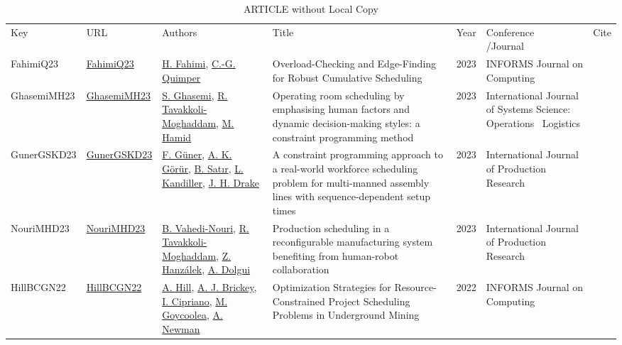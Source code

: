 {\scriptsize
\begin{longtable}{p{2cm}p{2cm}p{5cm}p{10cm}rp{3cm}l}
\rowcolor{white}\caption{ARTICLE without Local Copy}\\ \toprule
\rowcolor{white}Key & URL & Authors & Title & Year & \shortstack{Conference\\/Journal} & Cite\\ \midrule
\endhead
\bottomrule
\endfoot
FahimiQ23 & \href{http://dx.doi.org/10.1287/ijoc.2021.0138}{FahimiQ23} & \hyperref[auth:a122]{H. Fahimi}, \hyperref[auth:a37]{C.-G. Quimper} & Overload-Checking and Edge-Finding for Robust Cumulative Scheduling & 2023 & \cellcolor{red!20}INFORMS Journal on Computing & \cite{FahimiQ23}\\
GhasemiMH23 & \href{http://dx.doi.org/10.1080/23302674.2023.2224509}{GhasemiMH23} & \hyperref[auth:a982]{S. Ghasemi}, \hyperref[auth:a430]{R. Tavakkoli-Moghaddam}, \hyperref[auth:a983]{M. Hamid} & Operating room scheduling by emphasising human factors and dynamic decision-making styles: a constraint programming method & 2023 & \cellcolor{red!20}International Journal of Systems Science: Operations \  Logistics & \cite{GhasemiMH23}\\
GunerGSKD23 & \href{http://dx.doi.org/10.1080/00207543.2023.2226772}{GunerGSKD23} & \hyperref[auth:a1427]{F. G\"{u}ner}, \hyperref[auth:a1428]{A. K. G\"{o}r\"{u}r}, \hyperref[auth:a1429]{B. Satır}, \hyperref[auth:a1430]{L. Kandiller}, \hyperref[auth:a1431]{J. H. Drake} & A constraint programming approach to a real-world workforce scheduling problem for multi-manned assembly lines with sequence-dependent setup times & 2023 & \cellcolor{red!20}International Journal of Production Research & \cite{GunerGSKD23}\\
NouriMHD23 & \href{http://dx.doi.org/10.1080/00207543.2023.2173503}{NouriMHD23} & \hyperref[auth:a737]{B. Vahedi-Nouri}, \hyperref[auth:a430]{R. Tavakkoli-Moghaddam}, \hyperref[auth:a947]{Z. Hanzálek}, \hyperref[auth:a948]{A. Dolgui} & Production scheduling in a reconfigurable manufacturing system benefiting from human-robot collaboration & 2023 & \cellcolor{red!20}International Journal of Production Research & \cite{NouriMHD23}\\
HillBCGN22 & \href{http://dx.doi.org/10.1287/ijoc.2022.1222}{HillBCGN22} & \hyperref[auth:a64]{A. Hill}, \hyperref[auth:a972]{A. J. Brickey}, \hyperref[auth:a973]{I. Cipriano}, \hyperref[auth:a974]{M. Goycoolea}, \hyperref[auth:a975]{A. Newman} & Optimization Strategies for Resource-Constrained Project Scheduling Problems in Underground Mining & 2022 & \cellcolor{red!20}INFORMS Journal on Computing & \cite{HillBCGN22}\\

\end{longtable}}
